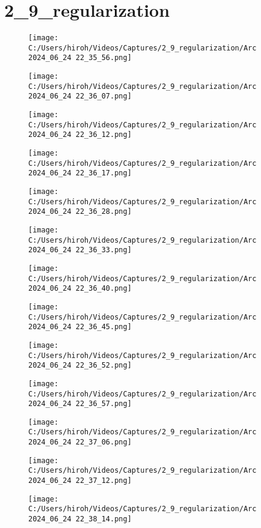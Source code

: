 \documentclass{ltjsarticle}
\begin{document}
\section{2\_9\_regularization}
\begin{figure}[htbp]
  \centering
  \texttt{[image: C:/Users/hiroh/Videos/Captures/2\_9\_regularization/Arc 2024\_06\_24 22\_35\_56.png]}
\end{figure}
\begin{figure}[htbp]
  \centering
  \texttt{[image: C:/Users/hiroh/Videos/Captures/2\_9\_regularization/Arc 2024\_06\_24 22\_36\_07.png]}
\end{figure}
\begin{figure}[htbp]
  \centering
  \texttt{[image: C:/Users/hiroh/Videos/Captures/2\_9\_regularization/Arc 2024\_06\_24 22\_36\_12.png]}
\end{figure}
\begin{figure}[htbp]
  \centering
  \texttt{[image: C:/Users/hiroh/Videos/Captures/2\_9\_regularization/Arc 2024\_06\_24 22\_36\_17.png]}
\end{figure}
\begin{figure}[htbp]
  \centering
  \texttt{[image: C:/Users/hiroh/Videos/Captures/2\_9\_regularization/Arc 2024\_06\_24 22\_36\_28.png]}
\end{figure}
\begin{figure}[htbp]
  \centering
  \texttt{[image: C:/Users/hiroh/Videos/Captures/2\_9\_regularization/Arc 2024\_06\_24 22\_36\_33.png]}
\end{figure}
\begin{figure}[htbp]
  \centering
  \texttt{[image: C:/Users/hiroh/Videos/Captures/2\_9\_regularization/Arc 2024\_06\_24 22\_36\_40.png]}
\end{figure}
\begin{figure}[htbp]
  \centering
  \texttt{[image: C:/Users/hiroh/Videos/Captures/2\_9\_regularization/Arc 2024\_06\_24 22\_36\_45.png]}
\end{figure}
\begin{figure}[htbp]
  \centering
  \texttt{[image: C:/Users/hiroh/Videos/Captures/2\_9\_regularization/Arc 2024\_06\_24 22\_36\_52.png]}
\end{figure}
\begin{figure}[htbp]
  \centering
  \texttt{[image: C:/Users/hiroh/Videos/Captures/2\_9\_regularization/Arc 2024\_06\_24 22\_36\_57.png]}
\end{figure}
\begin{figure}[htbp]
  \centering
  \texttt{[image: C:/Users/hiroh/Videos/Captures/2\_9\_regularization/Arc 2024\_06\_24 22\_37\_06.png]}
\end{figure}
\begin{figure}[htbp]
  \centering
  \texttt{[image: C:/Users/hiroh/Videos/Captures/2\_9\_regularization/Arc 2024\_06\_24 22\_37\_12.png]}
\end{figure}
\begin{figure}[htbp]
  \centering
  \texttt{[image: C:/Users/hiroh/Videos/Captures/2\_9\_regularization/Arc 2024\_06\_24 22\_38\_14.png]}
\end{figure}
\end{document}

